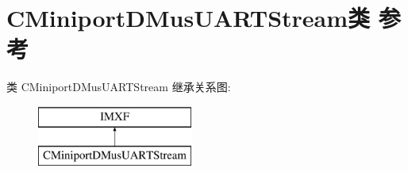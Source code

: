 \hypertarget{class_c_miniport_d_mus_u_a_r_t_stream}{}\section{C\+Miniport\+D\+Mus\+U\+A\+R\+T\+Stream类 参考}
\label{class_c_miniport_d_mus_u_a_r_t_stream}
类 C\+Miniport\+D\+Mus\+U\+A\+R\+T\+Stream 继承关系图\+:\begin{figure}[H]
\begin{center}
\leavevmode
\includegraphics[height=2.000000cm]{class_c_miniport_d_mus_u_a_r_t_stream}
\end{center}
\end{figure}

